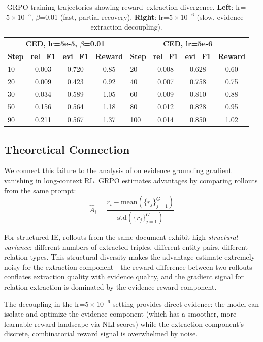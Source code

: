 \documentclass[11pt,a4paper]{article}
\begin{document}
\begin{table}[t]
\centering
\caption{GRPO training trajectories showing reward--extraction divergence. \textbf{Left}: lr=$5\times10^{-5}$, $\beta$=0.01 (fast, partial recovery). \textbf{Right}: lr=$5\times10^{-6}$ (slow, evidence--extraction decoupling).}
\label{tab:grpo_trajectory}
\small
\begin{tabular}{lccc|lccc}
\toprule
\multicolumn{4}{c|}{\textbf{CED, lr=5e-5, $\beta$=0.01}} & \multicolumn{4}{c}{\textbf{CED, lr=5e-6}} \\
\textbf{Step} & \textbf{rel\_F1} & \textbf{evi\_F1} & \textbf{Reward} & \textbf{Step} & \textbf{rel\_F1} & \textbf{evi\_F1} & \textbf{Reward} \\
\midrule
10  & 0.003 & 0.720 & 0.85 & 20  & 0.008 & 0.628 & 0.60 \\
20  & 0.009 & 0.423 & 0.92 & 40  & 0.007 & 0.758 & 0.75 \\
30  & 0.034 & 0.589 & 1.05 & 60  & 0.009 & 0.810 & 0.88 \\
50  & 0.156 & 0.564 & 1.18 & 80  & 0.012 & 0.828 & 0.95 \\
90  & 0.211 & 0.567 & 1.37 & 100 & 0.014 & 0.850 & 1.02 \\
\bottomrule
\end{tabular}
\end{table}

\subsection{Theoretical Connection}

We connect this failure to the analysis of \citet{longrlvr2026} on evidence grounding gradient vanishing in long-context RL.
GRPO estimates advantages by comparing rollouts from the same prompt:
\begin{equation}
    \hat{A}_i = \frac{r_i - \text{mean}(\{r_j\}_{j=1}^G)}{\text{std}(\{r_j\}_{j=1}^G)}
\end{equation}

For structured IE, rollouts from the same document exhibit high \emph{structural variance}: different numbers of extracted triples, different entity pairs, different relation types.
This structural diversity makes the advantage estimate extremely noisy for the extraction component---the reward difference between two rollouts conflates extraction quality with evidence quality, and the gradient signal for relation extraction is dominated by the evidence reward component.

The decoupling in the lr=$5\times10^{-6}$ setting provides direct evidence: the model can isolate and optimize the evidence component (which has a smoother, more learnable reward landscape via NLI scores) while the extraction component's discrete, combinatorial reward signal is overwhelmed by noise.
\end{document}
